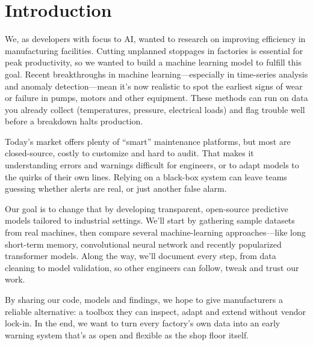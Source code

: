 \chapter{Introduction}
\label{chap:introduction}
\setlength{\parskip}{1em}

We, as developers with focus to AI, wanted to research on improving efficiency in manufacturing facilities. Cutting unplanned stoppages in factories is essential for peak productivity, so we wanted to build a machine learning model to fulfill this goal. Recent breakthroughs in machine learning—especially in time-series analysis and anomaly detection—mean it’s now realistic to spot the earliest signs of wear or failure in pumps, motors and other equipment. These methods can run on data you already collect (temperatures, pressure, electrical loads) and flag trouble well before a breakdown halts production.

Today’s market offers plenty of “smart” maintenance platforms, but most are closed-source, costly to customize and hard to audit. That makes it understanding errors and warnings difficult for engineers, or to adapt models to the quirks of their own lines. Relying on a black-box system can leave teams guessing whether alerts are real, or just another false alarm.

Our goal is to change that by developing transparent, open-source predictive models tailored to industrial settings. We’ll start by gathering sample datasets from real machines, then compare several machine-learning approaches—like long short-term memory, convolutional neural network and recently popularized transformer models. Along the way, we’ll document every step, from data cleaning to model validation, so other engineers can follow, tweak and trust our work.

By sharing our code, models and findings, we hope to give manufacturers a reliable alternative: a toolbox they can inspect, adapt and extend without vendor lock-in. In the end, we want to turn every factory’s own data into an early warning system that’s as open and flexible as the shop floor itself.